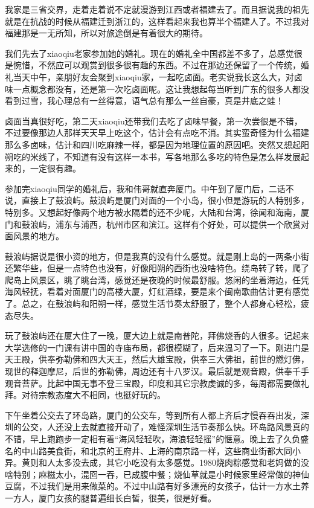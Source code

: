 我家是三省交界，走着走着说不定就漫游到江西或者福建去了。而且据说我的祖先就是在抗战的时候从福建迁到浙江的，这样看起来我也算半个福建人了。不过我对福建那是一无所知，所以对旅途倒是有着很大的期待。

我们先去了xiaoqiu老家参加她的婚礼。现在的婚礼全中国都差不多了，总感觉很是惋惜，不然应可以观赏到很多很有趣的东西。不过在那边还保留了一个传统，婚礼当天中午，亲朋好友会聚到xiaoqiu家，一起吃卤面。老实说我长这么大，对卤味一点概念都没有，还是第一次吃卤面呢。这让我想起每当听到广东的很多人都没看到过雪，我心理总有一丝得意，语气总有那么一丝自豪，真是井底之蛙！

卤面当真很好吃，第二天xiaoqiu还带我们去吃了卤味早餐，第一次尝很是不错，不过要像那边人那样天天早上吃这个，估计会有点吃不消。其实蛮奇怪为什么福建那么多卤味，估计和四川吃麻辣一样，都是因为地理位置的原因吧。突然又想起阳朔吃的米线了，不知道有没有这样一本书，写各地那么多吃的特色是怎么样发展起来的，一定很有趣。

参加完xiaoqiu同学的婚礼后，我和伟哥就直奔厦门。中午到了厦门后，二话不说，直接上了鼓浪屿。鼓浪屿是厦门对面的一个小岛，很小但是游玩的人特别多，特别多。又想起好像两个地方被水隔着的还不少呢，大陆和台湾，徐闻和海南，厦门和鼓浪屿，浦东与浦西，杭州市区和滨江。这样有个好处，可以提供一个欣赏对面风景的地方。

鼓浪屿据说是很小资的地方，但是我真的没有什么感觉。就是刚上岛的一两条小街还繁华些，但是一点特色也没有，好像阳朔的西街也没啥特色。绕岛转了转，爬了爬岛上风景区，眺了眺台湾，感觉还是夜晚的时候最舒服。悠闲的坐着海边，任凭海风轻抚，看着对面厦门的高楼大厦，灯红酒绿，要是来个闽南歌曲估计更有感觉了。总之，在鼓浪屿和阳朔一样，感觉生活节奏太舒服了，整个人都身心轻松，疲态尽失。

玩了鼓浪屿还在厦大住了一晚，厦大边上就是南普陀，拜佛烧香的人很多。记起来大学选修的一门课有讲中国的寺庙布局，都很模糊了，后来温习了一下。刚进门是天王殿，供奉弥勒佛和四大天王，然后大雄宝殿，供奉三大佛祖，前世的燃灯佛，现世的释迦摩尼，后世的弥勒佛，周边还有十八罗汉。最后就是观音殿，供奉千手观音菩萨。比起中国无事不登三宝殿，印度和其它宗教虔诚的多，每周都需要做礼拜。对待宗教态度大不相同，也挺好玩的。

下午坐着公交去了环岛路，厦门的公交车，等到所有人都上齐后才慢吞吞出发，深圳的公交，人还没上去就直接开动了，难怪深圳生活节奏那么快。环岛路风景真的不错，早上跑跑步一定相有着“海风轻轻吹，海浪轻轻摇”的惬意。晚上去了久负盛名的中山路美食街，和北京的王府井、上海的南京路一样，这些商业街都大同小异。黄则和人太多没去成，其它小吃没有太多感觉。1980烧肉粽感觉和老妈做的没啥特别；麻糍太小，混囵一吞，已成腹中餐；烧仙草就是小时候家里经常做的神仙豆腐，不过我们是用来做菜的。不过中山路有好多漂亮的女孩子，估计一方水土养一方人，厦门女孩的腿普遍细长白皙，很美，很是好看。

